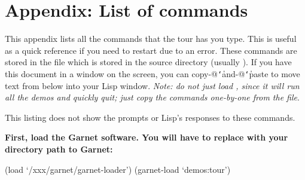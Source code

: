 \chapter*{Appendix: List of commands}
This appendix lists all the commands that the tour has you type.  This is
useful as a quick reference if you need to restart due to an error.
These commands are stored in
the file  which is stored in the  source
directory (usually ).
If you have this document in a window on the screen, you can
copy-@{\tt\char`\|}and-@{\tt\char`\|}paste to move text from below into your Lisp window.
{\it Note: do
not just load , since it will run all the demos and quickly
quit; just copy the commands one-by-one from the file}.

This listing does not show the prompts or Lisp's responses to these commands.

{\bf First, load the Garnet software.  You will have to replace 
with your directory path to Garnet:}
\begin{programexample}
(load `/xxx/garnet/garnet-loader')
(garnet-load `demos:tour')
\end{programexample}


